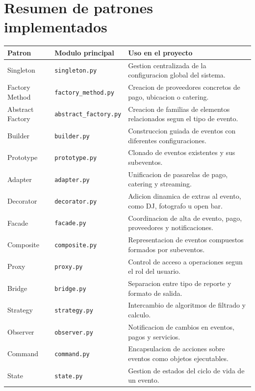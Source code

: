 \documentclass[12pt,a4paper]{article}
\begin{document}
\section{Resumen de patrones implementados}

\begin{longtable}{|p{3.3cm}|p{4cm}|p{7cm}|}
\hline
\textbf{Patron} & \textbf{Modulo principal} & \textbf{Uso en el proyecto} \\
\hline
Singleton & \texttt{singleton.py} & Gestion centralizada de la configuracion global del sistema. \\
\hline
Factory Method & \texttt{factory\_method.py} & Creacion de proveedores concretos de pago, ubicacion o catering. \\
\hline
Abstract Factory & \texttt{abstract\_factory.py} & Creacion de familias de elementos relacionados segun el tipo de evento. \\
\hline
Builder & \texttt{builder.py} & Construccion guiada de eventos con diferentes configuraciones. \\
\hline
Prototype & \texttt{prototype.py} & Clonado de eventos existentes y sus subeventos. \\
\hline
Adapter & \texttt{adapter.py} & Unificacion de pasarelas de pago, catering y streaming. \\
\hline
Decorator & \texttt{decorator.py} & Adicion dinamica de extras al evento, como DJ, fotografo u open bar. \\
\hline
Facade & \texttt{facade.py} & Coordinacion de alta de evento, pago, proveedores y notificaciones. \\
\hline
Composite & \texttt{composite.py} & Representacion de eventos compuestos formados por subeventos. \\
\hline
Proxy & \texttt{proxy.py} & Control de acceso a operaciones segun el rol del usuario. \\
\hline
Bridge & \texttt{bridge.py} & Separacion entre tipo de reporte y formato de salida. \\
\hline
Strategy & \texttt{strategy.py} & Intercambio de algoritmos de filtrado y calculo. \\
\hline
Observer & \texttt{observer.py} & Notificacion de cambios en eventos, pagos y servicios. \\
\hline
Command & \texttt{command.py} & Encapsulacion de acciones sobre eventos como objetos ejecutables. \\
\hline
State & \texttt{state.py} & Gestion de estados del ciclo de vida de un evento. \\

\end{longtable}
\end{document}
